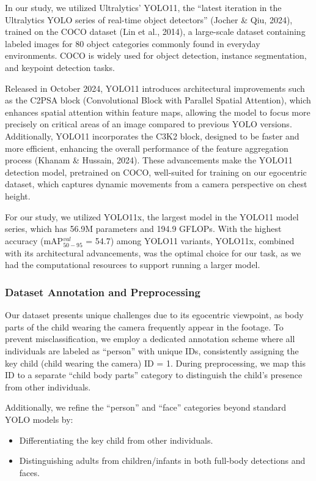 \documentclass[
  man,floatsintext]{apa6}
\providecommand{\tightlist}{%
  \setlength{\itemsep}{0pt}\setlength{\parskip}{0pt}}
\begin{document}
In our study, we utilized Ultralytics' YOLO11, the ``latest iteration in the Ultralytics YOLO series of real-time object detectors'' (Jocher \& Qiu, 2024), trained on the COCO dataset (Lin et al., 2014), a large-scale dataset containing labeled images for 80 object categories commonly found in everyday environments. COCO is widely used for object detection, instance segmentation, and keypoint detection tasks.

Released in October 2024, YOLO11 introduces architectural improvements such as the C2PSA block (Convolutional Block with Parallel Spatial Attention), which enhances spatial attention within feature maps, allowing the model to focus more precisely on critical areas of an image compared to previous YOLO versions. Additionally, YOLO11 incorporates the C3K2 block, designed to be faster and more efficient, enhancing the overall performance of the feature aggregation process (Khanam \& Hussain, 2024). These advancements make the YOLO11 detection model, pretrained on COCO, well-suited for training on our egocentric dataset, which captures dynamic movements from a camera perspective on chest height.

For our study, we utilized YOLO11x, the largest model in the YOLO11 model series, which has 56.9M parameters and 194.9 GFLOPs. With the highest accuracy (mAP\(^{val}_{50-95}\) = 54.7) among YOLO11 variants, YOLO11x, combined with its architectural advancements, was the optimal choice for our task, as we had the computational resources to support running a larger model.

\subsubsection{Dataset Annotation and Preprocessing}\label{dataset-annotation-and-preprocessing}

Our dataset presents unique challenges due to its egocentric viewpoint, as body parts of the child wearing the camera frequently appear in the footage. To prevent misclassification, we employ a dedicated annotation scheme where all individuals are labeled as ``person'' with unique IDs, consistently assigning the key child (child wearing the camera) ID = 1. During preprocessing, we map this ID to a separate ``child body parts'' category to distinguish the child's presence from other individuals.

Additionally, we refine the ``person'' and ``face'' categories beyond standard YOLO models by:

\begin{itemize}
\tightlist
\item
  Differentiating the key child from other individuals.
\item
  Distinguishing adults from children/infants in both full-body detections and faces.
\end{itemize}
\end{document}
